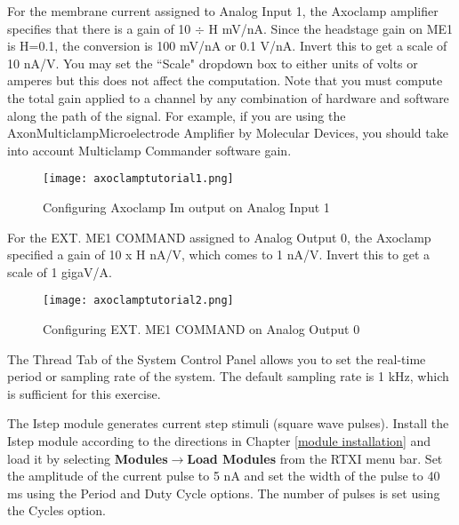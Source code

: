 \newpage For the membrane current assigned to Analog Input 1, the Axoclamp amplifier specifies that there is a gain of 10 $\div$ H mV/nA. Since the headstage gain on ME1 is H=0.1, the conversion is 100 mV/nA or 0.1 V/nA. Invert this to get a scale of 10 nA/V. You may set the ``Scale" dropdown box to either units of volts or amperes but this does not affect the computation. \attention Note that you must compute the total gain applied to a channel by any combination of hardware and software along the path of the signal. For example, if you are using the Axon\tm Multiclamp\tm Microelectrode Amplifier by Molecular Devices, you should take into account Multiclamp Commander software gain.

\begin{figure}[h]
\begin{center}
\texttt{[image: axoclamptutorial1.png]} 
\caption[Axoclamp Tutorial: Analog Input 1]{Configuring Axoclamp Im output on Analog Input 1} 
\end{center}
\label{fig:axoclamptutorial1}
\end{figure}
\vspace{1.5cm}

For the EXT. ME1 COMMAND assigned to Analog Output 0, the Axoclamp specified a gain of 10 x H nA/V, which comes to 1 nA/V. Invert this to get a scale of 1 gigaV/A.

\begin{figure}[h]
\begin{center}
\texttt{[image: axoclamptutorial2.png]} 
\caption[Axoclamp Tutorial: Analog Output 0]{Configuring EXT. ME1 COMMAND on Analog Output 0}
\end{center}
\label{fig:axoclamptutorial2}
\end{figure}

\attention The Thread Tab of the System Control Panel allows you to set the real-time period or sampling rate  of the system. The default sampling rate is 1 kHz, which is sufficient for this exercise.

\vspace{1cm}
 The Istep module generates  current step stimuli (square wave pulses). Install the Istep module according to the directions in Chapter \ref{module installation} and load it by selecting \textbf{Modules}$\rightarrow$\textbf{Load Modules} from the RTXI menu bar. Set the amplitude of the current pulse to 5 nA and set the width of the pulse to 40 ms using the Period and Duty Cycle options. The number of pulses is set using the Cycles option.

